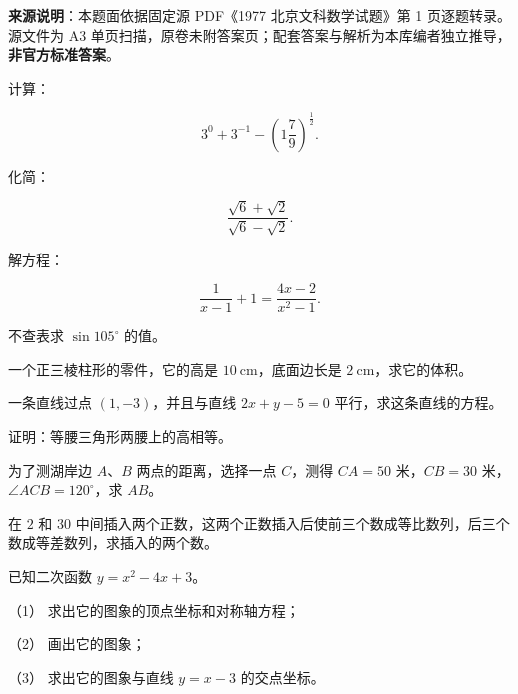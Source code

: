 

\begin{gktip}
\textbf{来源说明}：本题面依据固定源 PDF《1977 北京文科数学试题》第 1 页逐题转录。源文件为 A3 单页扫描，原卷未附答案页；配套答案与解析为本库编者独立推导，\textbf{非官方标准答案}。
\end{gktip}

\par\medskip

\begin{question}
计算：

\nopagebreak[4]
\[
3^0+3^{-1}-\left(1\frac79\right)^{\frac12}.
\]

\end{question}
\begin{question}
化简：

\nopagebreak[4]
\[
\frac{\sqrt6+\sqrt2}{\sqrt6-\sqrt2}.
\]

\end{question}
\begin{question}
解方程：

\nopagebreak[4]
\[
\frac1{x-1}+1=\frac{4x-2}{x^2-1}.
\]

\end{question}
\begin{question}
不查表求 $\sin105^\circ$ 的值。

\end{question}
\begin{question}
一个正三棱柱形的零件，它的高是 $10\ \mathrm{cm}$，底面边长是 $2\ \mathrm{cm}$，求它的体积。

\end{question}
\begin{question}
一条直线过点 $(1,-3)$，并且与直线 $2x+y-5=0$ 平行，求这条直线的方程。

\end{question}
\begin{question}
证明：等腰三角形两腰上的高相等。

\end{question}
\begin{question}
为了测湖岸边 $A\text{、}B$ 两点的距离，选择一点 $C$，测得 $CA=50$ 米，$CB=30$ 米，$\angle ACB=120^\circ$，求 $AB$。

\end{question}
\begin{question}
在 $2$ 和 $30$ 中间插入两个正数，这两个正数插入后使前三个数成等比数列，后三个数成等差数列，求插入的两个数。

\end{question}
\begin{question}
已知二次函数 $y=x^2-4x+3$。

（1） 求出它的图象的顶点坐标和对称轴方程；

（2） 画出它的图象；

（3） 求出它的图象与直线 $y=x-3$ 的交点坐标。

\end{question}